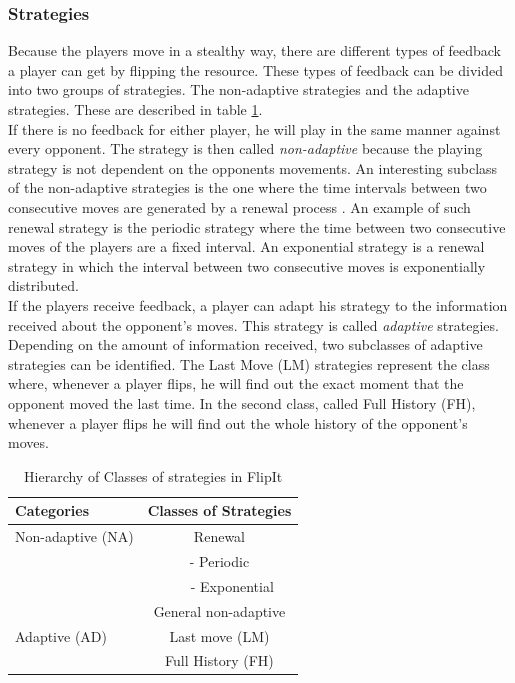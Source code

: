 \subsubsection{Strategies}
Because the players move in a stealthy way, there are different types of feedback a player can get by flipping the resource. These types of feedback can be divided into two groups of strategies. The non-adaptive strategies and the adaptive strategies. These are described in table \ref{table:Strategies}.\\

If there is no feedback for either player, he will play in the same manner against every opponent. The strategy is then called \textit{non-adaptive} because the playing strategy is not dependent on the opponents movements. An interesting subclass of the non-adaptive strategies is the one where the time intervals between two consecutive moves are generated by a renewal process . An example of such renewal strategy is the periodic strategy where the time between two consecutive moves of the players are a fixed interval. An exponential strategy is a renewal strategy in which the interval between two consecutive moves is exponentially distributed. \\

If the players receive feedback, a player can adapt his strategy to the information received about the opponent's moves. This strategy is called \textit{adaptive} strategies. Depending on the amount of information received, two subclasses of adaptive strategies can be identified. The Last Move (LM) strategies represent the class where, whenever a player flips, he will find out the exact moment that the opponent moved the last time. In the second class, called Full History (FH), whenever a player flips he will find out the whole history of the opponent's moves. \\


 \begin{table}
 \centering
 \begin{tabular}{ l | c  }
  \textbf{Categories} & \textbf{Classes of Strategies} \\
  \hline Non-adaptive (NA) & Renewal \\
  & - Periodic \\
  & ~~~ - Exponential \\
  & General non-adaptive \\
  \hline Adaptive (AD) & Last move (LM) \\
  & Full History (FH) \\  
\end{tabular}
 \caption{Hierarchy of Classes of strategies in FlipIt}
 \label{table:Strategies}
 \end{table}

